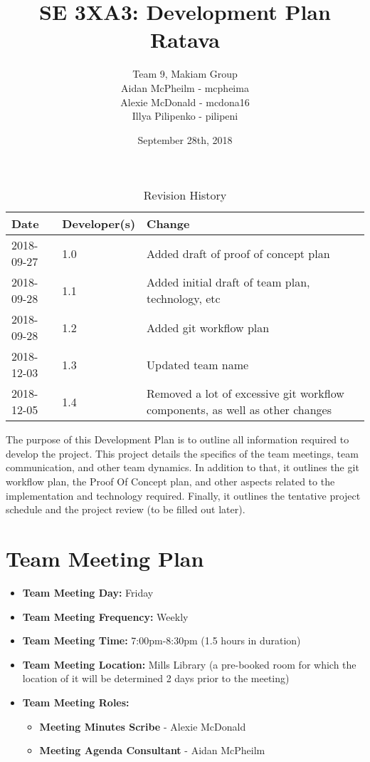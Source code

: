 \documentclass{article}
\title{SE 3XA3: Development Plan\\Ratava}
\author{Team 9, Makiam Group
		\\ Aidan McPheilm - mcpheima
		\\ Alexie McDonald - mcdona16
		\\ Illya Pilipenko  - pilipeni
}
\date{September 28th, 2018}
\begin{document}
\begin{table}[hp]
\caption{Revision History} \label{TblRevisionHistory}
\begin{tabularx}{\textwidth}{llX}
\toprule
\textbf{Date} & \textbf{Developer(s)} & \textbf{Change}\\
\midrule
2018-09-27 & 1.0 & Added draft of proof of concept plan\\
2018-09-28 & 1.1 & Added initial draft of team plan, technology, etc\\
2018-09-28 & 1.2 & Added git workflow plan\\
2018-12-03 & 1.3 & Updated team name\\
2018-12-05 & 1.4 & Removed a lot of excessive git workflow components, as well as other changes\\
\bottomrule
\end{tabularx}
\end{table}

\newpage

\maketitle

	The purpose of this Development Plan is to outline all information required to develop the project. This project details the specifics of the team meetings, team communication, and other team dynamics. In addition to that, it outlines the git workflow plan, the Proof Of Concept plan, and other aspects related to the implementation and technology required. Finally, it outlines the tentative project schedule and the project review (to be filled out later).

\section{Team Meeting Plan}

\begin{itemize}
\item{\textbf{Team Meeting Day:} Friday}

\item{\textbf{Team Meeting Frequency:} Weekly}

\item{\textbf{Team Meeting Time:} 7:00pm-8:30pm (1.5 hours in duration)}

\item{\textbf{Team Meeting Location:} Mills Library (a pre-booked room for which the location of it will be determined 2 days prior to the meeting)}

\item{\textbf{Team Meeting Roles:}}
\begin{itemize}
\item{\textbf{Meeting Minutes Scribe} - Alexie McDonald}
\item{\textbf{Meeting Agenda Consultant} - Aidan McPheilm}
\end{itemize}
\end{itemize}
\end{document}

